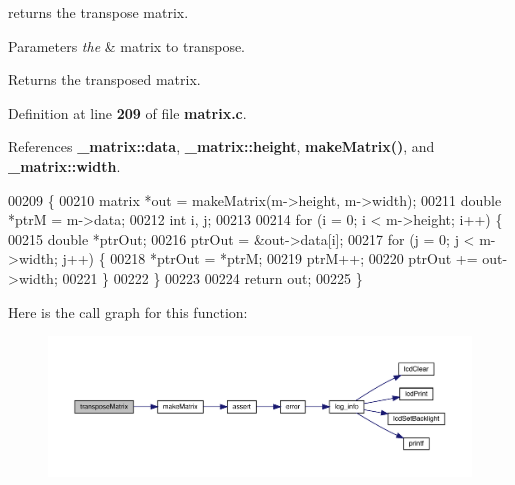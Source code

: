 returns the transpose matrix. 


\begin{DoxyParams}{Parameters}
{\em the} & matrix to transpose. \\
\hline
\end{DoxyParams}
\begin{DoxyReturn}{Returns}
the transposed matrix. 
\end{DoxyReturn}


Definition at line \textbf{ 209} of file \textbf{ matrix.\+c}.



References \textbf{ \+\_\+matrix\+::data}, \textbf{ \+\_\+matrix\+::height}, \textbf{ make\+Matrix()}, and \textbf{ \+\_\+matrix\+::width}.


\begin{DoxyCode}
00209                                    \{
00210   matrix *out = makeMatrix(m->height, m->width);
00211   \textcolor{keywordtype}{double} *ptrM = m->data;
00212   \textcolor{keywordtype}{int} i, j;
00213 
00214   \textcolor{keywordflow}{for} (i = 0; i < m->height; i++) \{
00215     \textcolor{keywordtype}{double} *ptrOut;
00216     ptrOut = &out->data[i];
00217     \textcolor{keywordflow}{for} (j = 0; j < m->width; j++) \{
00218       *ptrOut = *ptrM;
00219       ptrM++;
00220       ptrOut += out->width;
00221     \}
00222   \}
00223 
00224   \textcolor{keywordflow}{return} out;
00225 \}
\end{DoxyCode}
Here is the call graph for this function\+:
\nopagebreak
\begin{figure}[H]
\begin{center}
\leavevmode
\includegraphics[width=350pt]{matrix_8c_a2936260302742748b0639e8ec71d4d9f_cgraph}
\end{center}
\end{figure}
